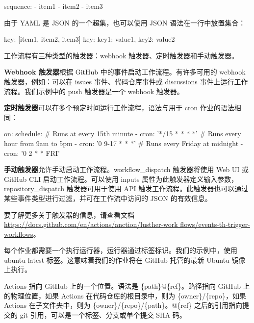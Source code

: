 \begin{shell}
sequence:
  - item1
  - item2
  - item3
\end{shell}

由于 YAML 是 JSON 的一个超集，也可以使用 JSON 语法在一行中放置集合：

\begin{shell}
key: [item1, item2, item3]
key: {key1: value1, key2: value2}
\end{shell}


工作流程有三种类型的触发器：webhook 触发器、定时触发器和手动触发器。

\textbf{Webhook 触发器}根据 GitHub 中的事件启动工作流程。有许多可用的 webhook 触发器，例如：可以在 issues 事件、代码仓库事件或 discussions 事件上运行工作流程。我们示例中的 push 触发器是一个 webhook 触发器。

\textbf{定时触发器}可以在多个预定时间运行工作流程，语法与用于 cron 作业的语法相同：

\begin{shell}
on:
  schedule:
    # Runs at every 15th minute
    - cron: '*/15 * * * *'
    # Runs every hour from 9am to 5pm
    - cron: '0 9-17 * * *'
    # Runs every Friday at midnight
    - cron: '0 2 * * FRI'
\end{shell}

\textbf{手动触发器}允许手动启动工作流程。workflow\_dispatch 触发器将使用 Web UI 或 GitHub CLI 启动工作流程。可以使用 inputs 属性为此触发器定义输入参数，repository\_dispatch 触发器可用于使用 API 触发工作流程。此触发器也可以通过某些事件类型进行过滤，并可在工作流中访问的 JSON 的有效信息。

要了解更多关于触发器的信息，请查看文档\url{https://docs.github.com/en/actions/anction/lusther-work flows/events-th-trigger-workflows}。


每个作业都需要一个执行运行器，运行器通过标签标识。我们的示例中，使用 ubuntu-latest 标签。这意味着我们的作业将在 GitHub 托管的最新 Ubuntu 镜像上执行。


Actions 指向 GitHub 上的一个位置。语法是 \{path\}@\{ref\}。路径指向 GitHub 上的物理位置，如果 Actions 在代码仓库的根目录中，则为 \{owner\}/\{repo\}，如果 Actions 在子文件夹中，则为 \{owner\}/\{repo\}/\{path\}。@\{ref\} 之后的引用指向提交的 git 引用，可以是一个标签、分支或单个提交 SHA 码。


